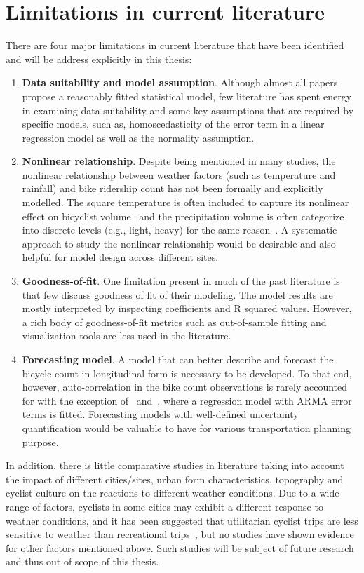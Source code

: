 \documentclass [11pt, proquest] {uwthesis}[2015/03/03]
\begin{document}
\section{Limitations in current literature}
There are four major limitations in current literature that have been identified and will be address explicitly in this thesis:
\begin{enumerate}
    \item \textbf{Data suitability and model assumption}. Although almost all papers propose a reasonably fitted statistical model, few literature has spent energy in examining data suitability and some key assumptions that are required by specific models, such as, homoscedasticity of the error term in a linear regression model as well as the normality assumption.
    \item \textbf{Nonlinear relationship}. Despite being mentioned in many studies, the nonlinear relationship between weather factors (such as temperature and rainfall) and bike ridership count has not been formally and explicitly modelled. The square temperature is often included to capture its nonlinear effect on bicyclist volume~\cite{Ahmed12,Rose07} and the precipitation volume is often categorize into discrete levels (e.g., light, heavy) for the same reason~\cite{Rose07,Thomas12}. A systematic approach to study the nonlinear relationship would be desirable and also helpful for model design across different sites.
    \item \textbf{Goodness-of-fit}. One limitation present in much of the past literature is that few discuss goodness of fit of their modeling. The model results are mostly interpreted by inspecting coefficients and R squared values. However, a rich body of goodness-of-fit metrics such as out-of-sample fitting and visualization tools are less used in the literature.
    \item \textbf{Forecasting model}. A model that can better describe and forecast the bicycle count in longitudinal form is necessary to be developed. To that end, however, auto-correlation in the bike count observations is rarely accounted for with the exception of~\cite{Gallop:2012aa} and~\cite{Nosal:2014aa}, where a regression model with ARMA error terms is fitted. Forecasting models with well-defined uncertainty quantification would be valuable to have for various transportation planning purpose.
\end{enumerate}
In addition, there is little comparative studies in literature taking into account the impact of different cities/sites, urban form characteristics, topography and cyclist culture on the reactions to different weather conditions. Due to a wide range of factors, cyclists in some cities may exhibit a different response to weather conditions, and it has been suggested that utilitarian cyclist trips are less sensitive to weather than recreational trips~\cite{Thomas09}, but no studies have shown evidence for other factors mentioned above. Such studies will be subject of future research and thus out of scope of this thesis.
\end{document}
